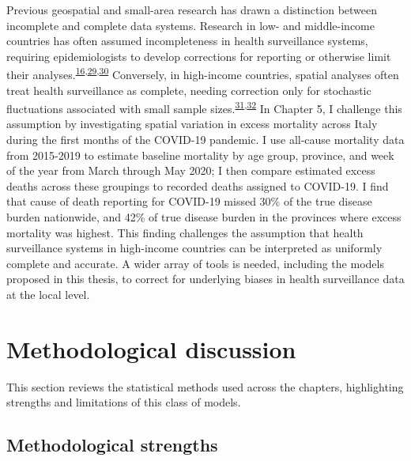 \documentclass[
]{article}
\begin{document}
Previous geospatial and small-area research has drawn a distinction between incomplete and complete data systems. Research in low- and middle-income countries has often assumed incompleteness in health surveillance systems, requiring epidemiologists to develop corrections for reporting or otherwise limit their analyses.\textsuperscript{\protect\hyperlink{ref-Shaweno2018}{16},\protect\hyperlink{ref-Adair2018}{29},\protect\hyperlink{ref-Zeng2020}{30}} Conversely, in high-income countries, spatial analyses often treat health surveillance as complete, needing correction only for stochastic fluctuations associated with small sample sizes.\textsuperscript{\protect\hyperlink{ref-Papoila2014}{31},\protect\hyperlink{ref-Boing2020}{32}} In Chapter 5, I challenge this assumption by investigating spatial variation in excess mortality across Italy during the first months of the COVID-19 pandemic. I use all-cause mortality data from 2015-2019 to estimate baseline mortality by age group, province, and week of the year from March through May 2020; I then compare estimated excess deaths across these groupings to recorded deaths assigned to COVID-19. I find that cause of death reporting for COVID-19 missed 30\% of the true disease burden nationwide, and 42\% of true disease burden in the provinces where excess mortality was highest. This finding challenges the assumption that health surveillance systems in high-income countries can be interpreted as uniformly complete and accurate. A wider array of tools is needed, including the models proposed in this thesis, to correct for underlying biases in health surveillance data at the local level.

\hypertarget{methodological-discussion}{%
\section{Methodological discussion}\label{methodological-discussion}}

This section reviews the statistical methods used across the chapters, highlighting strengths and limitations of this class of models.

\hypertarget{methodological-strengths}{%
\subsection{Methodological strengths}\label{methodological-strengths}}
\end{document}

